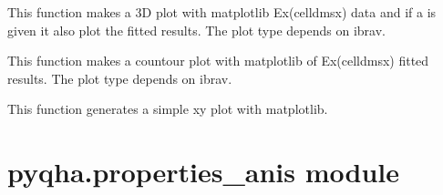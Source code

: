 \documentclass[letterpaper,10pt,english]{sphinxmanual}
\begin{document}

\begin{fulllineitems}
\label{pyqha:pyqha.plotutils.plot_Etot}
This function makes a 3D plot with matplotlib Ex(celldmsx) data and if a is given it also plot
the fitted results. The plot type depends on ibrav.

\end{fulllineitems}


\begin{fulllineitems}
\label{pyqha:pyqha.plotutils.plot_Etot_contour}
This function makes a countour plot with matplotlib of Ex(celldmsx) fitted results. 
The plot type depends on ibrav.

\end{fulllineitems}


\begin{fulllineitems}
\label{pyqha:pyqha.plotutils.simple_plot_xy}
This function generates a simple xy plot with matplotlib.

\end{fulllineitems}



\section{pyqha.properties\_anis module}
\label{pyqha:module-pyqha.properties_anis}\label{pyqha:pyqha-properties-anis-module}
\end{document}
